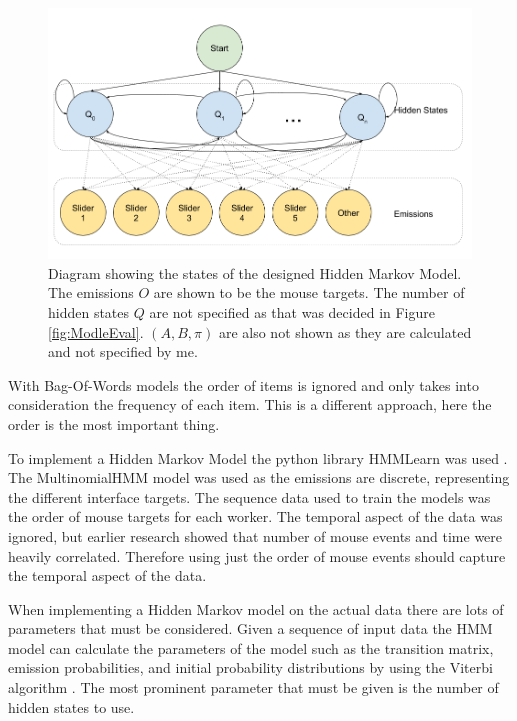 \documentclass{article}
\begin{document}
\begin{figure}[ht]
    \centering
    \includegraphics[scale=0.45]{Images/My HMM.png}
    \caption{
        Diagram showing the states of the designed Hidden Markov Model.
        The emissions $O$ are shown to be the mouse targets.
        The number of hidden states $Q$ are not specified as that was decided in Figure \ref{fig:ModleEval}.
        $(A,B,\pi)$ are also not shown as they are calculated and not specified by me.
    }
    \label{fig:MyHMM}
\end{figure}

With Bag-Of-Words models the order of items is ignored and only takes into consideration the frequency of each item.
This is a different approach, here the order is the most important thing.

To implement a Hidden Markov Model the python library HMMLearn was used \cite{hmmlearn}.
The MultinomialHMM model was used as the emissions are discrete, representing the different interface targets.
The sequence data used to train the models was the order of mouse targets for each worker.
The temporal aspect of the data was ignored, but earlier research showed that number of mouse events and time were heavily correlated.
Therefore using just the order of mouse events should capture the temporal aspect of the data.

When implementing a Hidden Markov model on the actual data there are lots of parameters that must be considered. 
Given a sequence of input data the HMM model can calculate the parameters of the model such as the transition matrix, emission probabilities, and initial probability distributions by using the Viterbi algorithm \cite{hmmlearn}.
The most prominent parameter that must be given is the number of hidden states to use.
\end{document}
